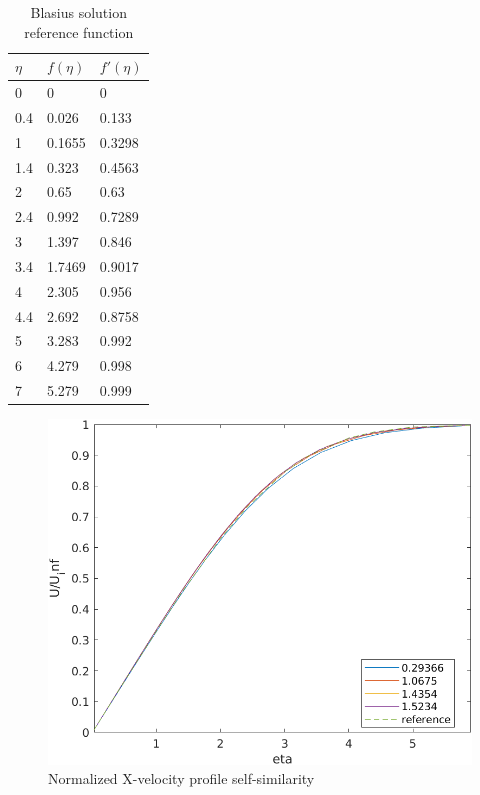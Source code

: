 \documentclass[12pt]{article}
\begin{document}
        \begin{table}[ht!]
                \centering
                \begin{tabular}{lll}
                        \hline
                        $ \eta $ & \( f(\eta) \) & \( f'(\eta) \) \\ \hline
                        0       & 0             & 0             \\
                        0.4     & 0.026         & 0.133         \\
                        1       & 0.1655        & 0.3298        \\
                        1.4     & 0.323         & 0.4563        \\
                        2       & 0.65          & 0.63          \\
                        2.4     & 0.992         & 0.7289        \\
                        3       & 1.397         & 0.846         \\
                        3.4     & 1.7469        & 0.9017        \\
                        4       & 2.305         & 0.956         \\
                        4.4     & 2.692         & 0.8758        \\
                        5       & 3.283         & 0.992         \\
                        6       & 4.279         & 0.998         \\
                        7       & 5.279         & 0.999         \\ \hline
                \end{tabular}
                \caption{Blasius solution reference function}
                \label{tab:eta}
        \end{table}

        \begin{figure}[ht!]
                \centering
                \includegraphics[width=\textwidth]{u_collapsed.png}
                \caption{Normalized X-velocity profile self-similarity}
                \label{fig:u_similarity}
        \end{figure}
\end{document}
